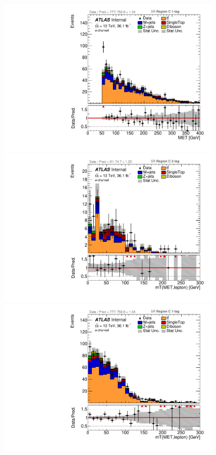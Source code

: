 \begin{figure}[!htbp]
\begin{center}
\includegraphics[scale=0.33]{./figures/boosted/ABCD_ScaledPrompt/elec_SR_RegionC_1tag_MET}\\
\includegraphics[scale=0.33]{./figures/boosted/ABCD_ScaledPrompt/elec_SR_RegionC_WlepMtATLAS}
\includegraphics[scale=0.33]{./figures/boosted/ABCD_ScaledPrompt/elec_SR_RegionC_1tag_WlepMtATLAS}\\

\end{center}
\end{figure}
